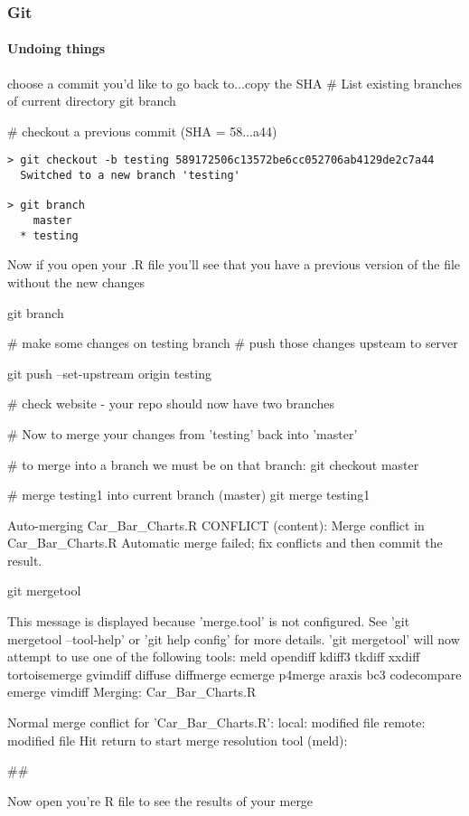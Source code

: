 \documentclass[xcolor=dvipsnames]{beamer}
\begin{document}
\begin{frame} 
\frametitle{Git}
\framesubtitle{Undoing things}
choose a commit you'd like to go back to...copy the SHA
\newline
\newline
# List existing branches of current directory
git branch

# checkout a previous commit (SHA = 58...a44) 
\begin{verbatim}
> git checkout -b testing 589172506c13572be6cc052706ab4129de2c7a44
  Switched to a new branch 'testing'

> git branch
    master
  * testing

\end{verbatim}

Now if you open your .R file you'll see that you have a previous version of the file without the new changes

git branch

# make some changes on testing branch
# push those changes upsteam to server

git push --set-upstream origin testing

# check website - your repo should now have two branches

# Now to merge your changes from 'testing' back into 'master'

# to merge into a branch we must be on that branch:
git checkout master

# merge testing1 into current branch (master)
git merge testing1

Auto-merging Car_Bar_Charts.R
CONFLICT (content): Merge conflict in Car_Bar_Charts.R
Automatic merge failed; fix conflicts and then commit the result.

git mergetool

This message is displayed because 'merge.tool' is not configured.
See 'git mergetool --tool-help' or 'git help config' for more details.
'git mergetool' will now attempt to use one of the following tools:
meld opendiff kdiff3 tkdiff xxdiff tortoisemerge gvimdiff diffuse diffmerge ecmerge p4merge araxis bc3 codecompare emerge vimdiff
Merging:
Car_Bar_Charts.R

Normal merge conflict for 'Car_Bar_Charts.R':
  {local}: modified file
  {remote}: modified file
Hit return to start merge resolution tool (meld): 

## 

Now open you're R file to see the results of your merge








\end{frame}
\end{document}
